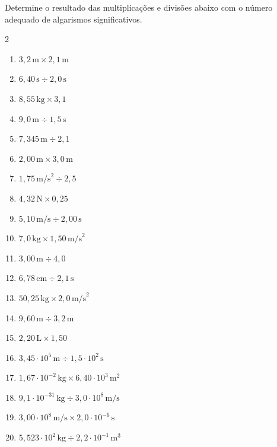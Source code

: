 \begin{question}[type={exam}]
Determine o resultado das multiplicações e divisões abaixo com o número adequado de algarismos significativos.
\begin{multicols}{2}
\begin{enumerate}
\item $3{,}2\,\text{m} \times 2{,}1\,\text{m}$
\item $6{,}40\,\text{s} \div 2{,}0\,\text{s}$
\item $8{,}55\,\text{kg} \times 3{,}1$
\item $9{,}0\,\text{m} \div 1{,}5\,\text{s}$
\item $7{,}345\,\text{m} \div 2{,}1$
\item $2{,}00\,\text{m} \times 3{,}0\,\text{m}$
\item $1{,}75\,\text{m/s}^2 \div 2{,}5$
\item $4{,}32\,\text{N} \times 0{,}25$
\item $5{,}10\,\text{m/s} \div 2{,}00\,\text{s}$
\item $7{,}0\,\text{kg} \times 1{,}50\,\text{m/s}^2$
\item $3{,}00\,\text{m} \div 4{,}0$
\item $6{,}78\,\text{cm} \div 2{,}1\,\text{s}$
\item $50{,}25\,\text{kg} \times 2{,}0\,\text{m/s}^2$
\item $9{,}60\,\text{m} \div 3{,}2\,\text{m}$
\item $2{,}20\,\text{L} \times 1{,}50$
\item $3{,}45 \cdot 10^5\,\text{m} \div 1{,}5 \cdot 10^2\,\text{s}$
\item $1{,}67 \cdot 10^{-2}\,\text{kg} \times 6{,}40 \cdot 10^{3}\,\text{m}^2$
\item $9{,}1 \cdot 10^{-31}\,\text{kg} \div 3{,}0 \cdot 10^{8}\,\text{m/s}$
\item $3{,}00 \cdot 10^8\,\text{m/s} \times 2{,}0 \cdot 10^{-6}\,\text{s}$
\item $5{,}523 \cdot 10^2\,\text{kg} \div 2{,}2 \cdot 10^{-1}\,\text{m}^3$
\end{enumerate}
\end{multicols}
\end{question}

